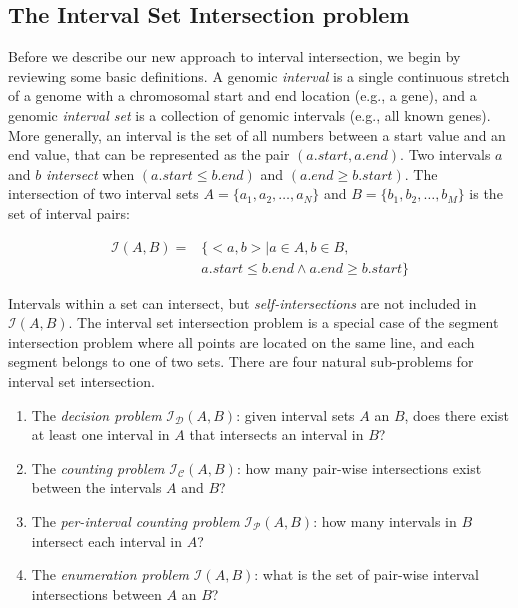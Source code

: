 \documentclass{bioinfo}
\begin{document}
	\subsection{The Interval Set Intersection problem}
	Before we describe our new approach to interval intersection, we begin by reviewing
	some basic definitions.  A genomic \emph{interval} is a single continuous stretch of a genome 
	with a chromosomal start and end location (e.g., a gene), and a genomic \emph{interval set} is a
	collection of genomic intervals (e.g., all known genes).  More generally, an
	interval is the set of all numbers between a start value and an end value, that
	can be represented as the pair $(a.start, a.end)$.  Two intervals $a$ and $b$
	{\em intersect} when $(a.start \leq b.end)$ and $(a.end \geq b.start)$.  The
	intersection of two interval sets $A=\{a_1, a_2, \dots, a_N\}$ and
	$B=\{b_1, b_2, \dots, b_M\}$ is the set of interval pairs:

	\begin{equation*}
		\begin{split}
			\mathcal{I}(A,B)= &\{ <a,b> | a \in A, b \in B, \\
			& a.start \leq b.end \wedge a.end \geq b.start\}
		\end{split}
	\end{equation*}

	Intervals within a set can intersect, but {\em self-intersections} are
	not included in $\mathcal{I}(A,B)$.  The interval set intersection 
	problem is a special case of the segment intersection problem where 
	all points are located on the same line, and each segment belongs to 
	one of two sets. There are four natural sub-problems for interval set 
	intersection.
	\begin{enumerate}
		\item The {\em decision problem} $\mathcal{I_D}(A,B)$:  given interval sets $A$
		an $B$, does there exist at least one interval in $A$ that intersects an interval in
		$B$?
		\item The {\em counting problem} $\mathcal{I_C}(A,B)$: how many pair-wise
		intersections exist between the intervals $A$ and $B$?
		\item The {\em per-interval counting problem} $\mathcal{I_P}(A,B)$: how many
		intervals in $B$ intersect each interval in $A$?
		\item The {\em enumeration problem} $\mathcal{I}(A,B)$: what is the set of
		pair-wise interval intersections between $A$ an $B$?
	\end{enumerate}
	
\end{document}
